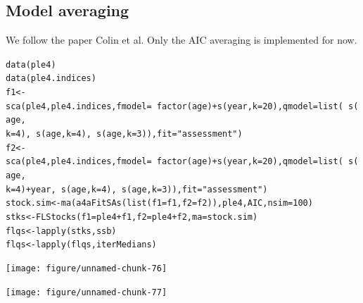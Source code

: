 \documentclass[a4paper,english,10pt]{article}\usepackage[]{graphicx}\usepackage[]{color}
\makeatletter
\newcommand{\hlnum}[1]{\textcolor[rgb]{0.2,0.2,0.2}{#1}}%
\newcommand{\hlstr}[1]{\textcolor[rgb]{0.2,0.2,0.2}{#1}}%
\newcommand{\hlopt}[1]{\textcolor[rgb]{0.2,0.2,0.2}{#1}}%
\newcommand{\hlstd}[1]{\textcolor[rgb]{0,0,0}{#1}}%
\newcommand{\hlkwb}[1]{\textcolor[rgb]{0.361,0.506,0.596}{#1}}%
\newcommand{\hlkwc}[1]{\textcolor[rgb]{0.361,0.506,0.596}{#1}}%
\newcommand{\hlkwd}[1]{\textcolor[rgb]{0.361,0.506,0.596}{#1}}%
\newenvironment{kframe}{%
 \def\at@end@of@kframe{}%
 \ifinner\ifhmode%
  \def\at@end@of@kframe{\end{minipage}}%
  \begin{minipage}{\columnwidth}%
 \fi\fi%
 \def\FrameCommand##1{\hskip\@totalleftmargin \hskip-\fboxsep
 \colorbox{shadecolor}{##1}\hskip-\fboxsep
     \hskip-\linewidth \hskip-\@totalleftmargin \hskip\columnwidth}%
 \MakeFramed {\advance\hsize-\width
   \@totalleftmargin\z@ \linewidth\hsize
   \@setminipage}}%
 {\par\unskip\endMakeFramed%
 \at@end@of@kframe}
\newenvironment{knitrout}{}{} %
\makeatother
\begin{document}
\subsection{Model averaging}

We follow the paper Colin et al. Only the AIC averaging is implemented for now.

\begin{knitrout}
\color{fgcolor}\begin{kframe}
\begin{alltt}
\hlkwd{data}\hlstd{(ple4)}
\hlkwd{data}\hlstd{(ple4.indices)}
\hlstd{f1} \hlkwb{<-} \hlkwd{sca}\hlstd{(ple4, ple4.indices,} \hlkwc{fmodel} \hlstd{=} \hlopt{~}\hlkwd{factor}\hlstd{(age)} \hlopt{+} \hlkwd{s}\hlstd{(year,} \hlkwc{k} \hlstd{=} \hlnum{20}\hlstd{),} \hlkwc{qmodel} \hlstd{=} \hlkwd{list}\hlstd{(}\hlopt{~}\hlkwd{s}\hlstd{(age,}
    \hlkwc{k} \hlstd{=} \hlnum{4}\hlstd{),} \hlopt{~}\hlkwd{s}\hlstd{(age,} \hlkwc{k} \hlstd{=} \hlnum{4}\hlstd{),} \hlopt{~}\hlkwd{s}\hlstd{(age,} \hlkwc{k} \hlstd{=} \hlnum{3}\hlstd{)),} \hlkwc{fit} \hlstd{=} \hlstr{"assessment"}\hlstd{)}
\hlstd{f2} \hlkwb{<-} \hlkwd{sca}\hlstd{(ple4, ple4.indices,} \hlkwc{fmodel} \hlstd{=} \hlopt{~}\hlkwd{factor}\hlstd{(age)} \hlopt{+} \hlkwd{s}\hlstd{(year,} \hlkwc{k} \hlstd{=} \hlnum{20}\hlstd{),} \hlkwc{qmodel} \hlstd{=} \hlkwd{list}\hlstd{(}\hlopt{~}\hlkwd{s}\hlstd{(age,}
    \hlkwc{k} \hlstd{=} \hlnum{4}\hlstd{)} \hlopt{+} \hlstd{year,} \hlopt{~}\hlkwd{s}\hlstd{(age,} \hlkwc{k} \hlstd{=} \hlnum{4}\hlstd{),} \hlopt{~}\hlkwd{s}\hlstd{(age,} \hlkwc{k} \hlstd{=} \hlnum{3}\hlstd{)),} \hlkwc{fit} \hlstd{=} \hlstr{"assessment"}\hlstd{)}
\hlstd{stock.sim} \hlkwb{<-} \hlkwd{ma}\hlstd{(}\hlkwd{a4aFitSAs}\hlstd{(}\hlkwd{list}\hlstd{(}\hlkwc{f1} \hlstd{= f1,} \hlkwc{f2} \hlstd{= f2)), ple4, AIC,} \hlkwc{nsim} \hlstd{=} \hlnum{100}\hlstd{)}
\hlstd{stks} \hlkwb{<-} \hlkwd{FLStocks}\hlstd{(}\hlkwc{f1} \hlstd{= ple4} \hlopt{+} \hlstd{f1,} \hlkwc{f2} \hlstd{= ple4} \hlopt{+} \hlstd{f2,} \hlkwc{ma} \hlstd{= stock.sim)}
\hlstd{flqs} \hlkwb{<-} \hlkwd{lapply}\hlstd{(stks, ssb)}
\hlstd{flqs} \hlkwb{<-} \hlkwd{lapply}\hlstd{(flqs, iterMedians)}
\end{alltt}
\end{kframe}
\end{knitrout}


\begin{knitrout}
\color{fgcolor}

{\centering \texttt{[image: figure/unnamed-chunk-76]} 

}



\end{knitrout}


\begin{knitrout}
\color{fgcolor}

{\centering \texttt{[image: figure/unnamed-chunk-77]} 

}



\end{knitrout}
\end{document}
